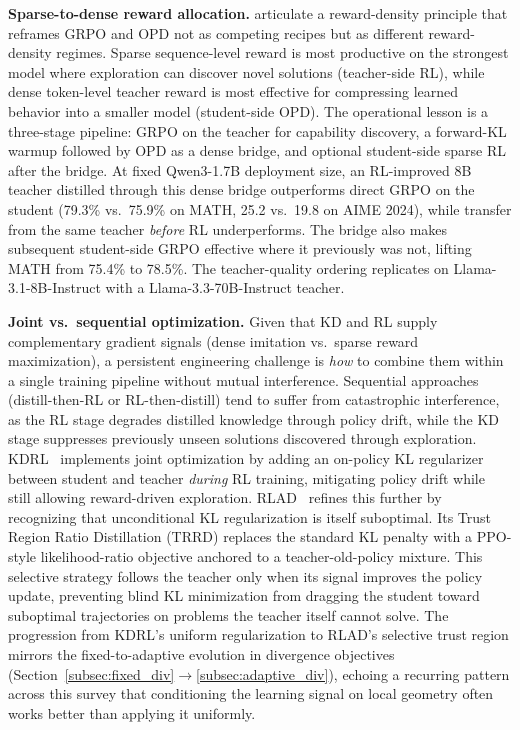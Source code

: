 \documentclass{article} %
\begin{document}
\textbf{Sparse-to-dense reward allocation.} \citet{2605.12483} articulate a reward-density principle that reframes GRPO and OPD not as competing recipes but as different reward-density regimes. Sparse sequence-level reward is most productive on the strongest model where exploration can discover novel solutions (teacher-side RL), while dense token-level teacher reward is most effective for compressing learned behavior into a smaller model (student-side OPD). The operational lesson is a three-stage pipeline: GRPO on the teacher for capability discovery, a forward-KL warmup followed by OPD as a dense bridge, and optional student-side sparse RL after the bridge. At fixed Qwen3-1.7B deployment size, an RL-improved 8B teacher distilled through this dense bridge outperforms direct GRPO on the student (79.3\% vs.\ 75.9\% on MATH, 25.2 vs.\ 19.8 on AIME 2024), while transfer from the same teacher \emph{before} RL underperforms. The bridge also makes subsequent student-side GRPO effective where it previously was not, lifting MATH from 75.4\% to 78.5\%. The teacher-quality ordering replicates on Llama-3.1-8B-Instruct with a Llama-3.3-70B-Instruct teacher.

\textbf{Joint vs.\ sequential optimization.} Given that KD and RL supply complementary gradient signals (dense imitation vs.\ sparse reward maximization), a persistent engineering challenge is \emph{how} to combine them within a single training pipeline without mutual interference. Sequential approaches (distill-then-RL or RL-then-distill) tend to suffer from catastrophic interference, as the RL stage degrades distilled knowledge through policy drift, while the KD stage suppresses previously unseen solutions discovered through exploration. KDRL~\citep{2506.02208} implements joint optimization by adding an on-policy KL regularizer between student and teacher \emph{during} RL training, mitigating policy drift while still allowing reward-driven exploration. RLAD~\citep{2602.22495} refines this further by recognizing that unconditional KL regularization is itself suboptimal. Its Trust Region Ratio Distillation (TRRD) replaces the standard KL penalty with a PPO-style likelihood-ratio objective anchored to a teacher-old-policy mixture. This selective strategy follows the teacher only when its signal improves the policy update, preventing blind KL minimization from dragging the student toward suboptimal trajectories on problems the teacher itself cannot solve. The progression from KDRL's uniform regularization to RLAD's selective trust region mirrors the fixed-to-adaptive evolution in divergence objectives (Section~\ref{subsec:fixed_div}$\to$\ref{subsec:adaptive_div}), echoing a recurring pattern across this survey that conditioning the learning signal on local geometry often works better than applying it uniformly.
\end{document}
